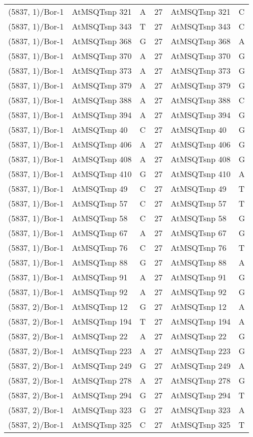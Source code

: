 \begin{center}
\begin{longtable}{|l|l|l|l|l|l|}
(5837, 1)/Bor-1&AtMSQTsnp 321&A&27&AtMSQTsnp 321&C\\
(5837, 1)/Bor-1&AtMSQTsnp 343&T&27&AtMSQTsnp 343&C\\
(5837, 1)/Bor-1&AtMSQTsnp 368&G&27&AtMSQTsnp 368&A\\
(5837, 1)/Bor-1&AtMSQTsnp 370&A&27&AtMSQTsnp 370&G\\
(5837, 1)/Bor-1&AtMSQTsnp 373&A&27&AtMSQTsnp 373&G\\
(5837, 1)/Bor-1&AtMSQTsnp 379&A&27&AtMSQTsnp 379&G\\
(5837, 1)/Bor-1&AtMSQTsnp 388&A&27&AtMSQTsnp 388&C\\
(5837, 1)/Bor-1&AtMSQTsnp 394&A&27&AtMSQTsnp 394&G\\
(5837, 1)/Bor-1&AtMSQTsnp 40&C&27&AtMSQTsnp 40&G\\
(5837, 1)/Bor-1&AtMSQTsnp 406&A&27&AtMSQTsnp 406&G\\
(5837, 1)/Bor-1&AtMSQTsnp 408&A&27&AtMSQTsnp 408&G\\
(5837, 1)/Bor-1&AtMSQTsnp 410&G&27&AtMSQTsnp 410&A\\
(5837, 1)/Bor-1&AtMSQTsnp 49&C&27&AtMSQTsnp 49&T\\
(5837, 1)/Bor-1&AtMSQTsnp 57&C&27&AtMSQTsnp 57&T\\
(5837, 1)/Bor-1&AtMSQTsnp 58&C&27&AtMSQTsnp 58&G\\
(5837, 1)/Bor-1&AtMSQTsnp 67&A&27&AtMSQTsnp 67&G\\
(5837, 1)/Bor-1&AtMSQTsnp 76&C&27&AtMSQTsnp 76&T\\
(5837, 1)/Bor-1&AtMSQTsnp 88&G&27&AtMSQTsnp 88&A\\
(5837, 1)/Bor-1&AtMSQTsnp 91&A&27&AtMSQTsnp 91&G\\
(5837, 1)/Bor-1&AtMSQTsnp 92&A&27&AtMSQTsnp 92&G\\
(5837, 2)/Bor-1&AtMSQTsnp 12&G&27&AtMSQTsnp 12&A\\
(5837, 2)/Bor-1&AtMSQTsnp 194&T&27&AtMSQTsnp 194&A\\
(5837, 2)/Bor-1&AtMSQTsnp 22&A&27&AtMSQTsnp 22&G\\
(5837, 2)/Bor-1&AtMSQTsnp 223&A&27&AtMSQTsnp 223&G\\
(5837, 2)/Bor-1&AtMSQTsnp 249&G&27&AtMSQTsnp 249&A\\
(5837, 2)/Bor-1&AtMSQTsnp 278&A&27&AtMSQTsnp 278&G\\
(5837, 2)/Bor-1&AtMSQTsnp 294&G&27&AtMSQTsnp 294&T\\
(5837, 2)/Bor-1&AtMSQTsnp 323&G&27&AtMSQTsnp 323&A\\
(5837, 2)/Bor-1&AtMSQTsnp 325&C&27&AtMSQTsnp 325&T\\

\end{longtable}
\end{center}
